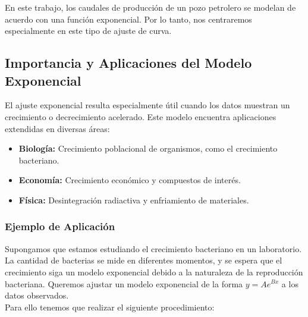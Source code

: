 En este trabajo, los caudales de producción de un pozo petrolero se modelan de acuerdo con una función exponencial. Por lo tanto, nos centraremos especialmente en este tipo de ajuste de curva.

\subsection{Importancia y Aplicaciones del Modelo Exponencial}

El ajuste exponencial resulta especialmente útil cuando los datos muestran un crecimiento o decrecimiento acelerado. Este modelo encuentra aplicaciones extendidas en diversas áreas:

\begin{itemize}
    \item \textbf{Biología:} Crecimiento poblacional de organismos, como el crecimiento bacteriano.
    \item \textbf{Economía:} Crecimiento económico y compuestos de interés.
    \item \textbf{Física:} Desintegración radiactiva y enfriamiento de materiales.
\end{itemize}



\subsubsection{Ejemplo de Aplicación}

Supongamos que estamos estudiando el crecimiento bacteriano en un laboratorio. La cantidad de bacterias se mide en diferentes momentos, y se espera que el crecimiento siga un modelo exponencial debido a la naturaleza de la reproducción bacteriana. Queremos ajustar un modelo exponencial de la forma \( y = Ae^{Bx} \) a los datos observados.\\
Para ello tenemos que realizar el siguiente procedimiento:

